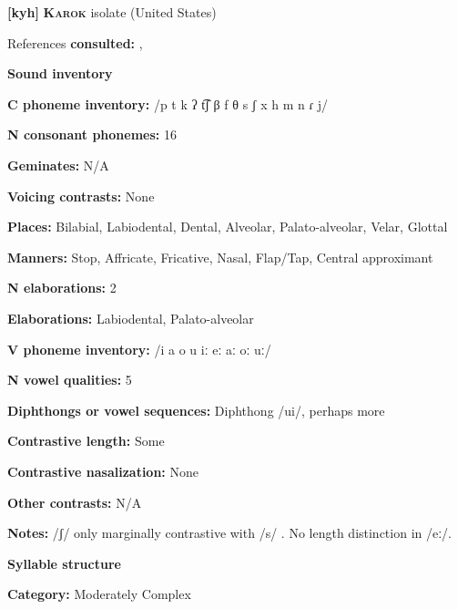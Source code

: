 \textbf{[kyh]}   \textbf{\textsc{Karok}}  isolate (United States)



References \textbf{consulted:} \citet{Bright1957}, \citet{Sandy2014}



\textbf{Sound inventory}



\textbf{C phoneme inventory:} /p t k ʔ t͡ʃ β f θ s ʃ x h m n ɾ j/



\textbf{N consonant phonemes:} 16



\textbf{Geminates:} N/A



\textbf{Voicing contrasts:} None



\textbf{Places:} Bilabial, Labiodental, Dental, Alveolar, Palato-alveolar, Velar, Glottal



\textbf{Manners:} Stop, Affricate, Fricative, Nasal, Flap/Tap, Central approximant



\textbf{N elaborations:} 2



\textbf{Elaborations:} Labiodental, Palato-alveolar



\textbf{V phoneme inventory:} /i a o u iː eː aː oː uː/



\textbf{N vowel qualities:} 5



\textbf{Diphthongs or vowel sequences:} Diphthong /ui/, perhaps more



\textbf{Contrastive length:} Some



\textbf{Contrastive nasalization:} None



\textbf{Other contrasts:} N/A



\textbf{Notes:} /ʃ/ only marginally contrastive with /s/ \citep[17]{Bright1957}. No length distinction in /eː/.



\textbf{Syllable structure}



\textbf{Category:} Moderately Complex



